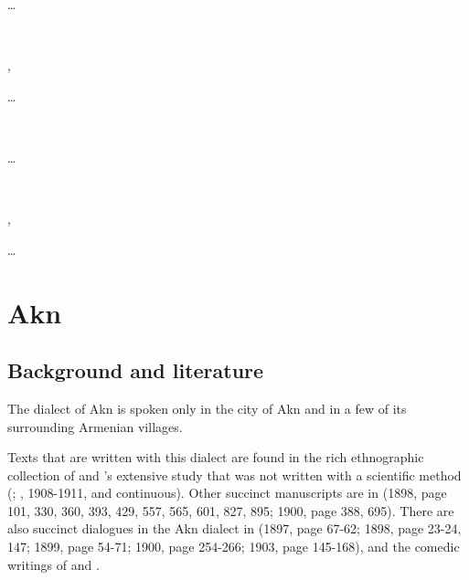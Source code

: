 \begin{adjarianpage}\label{page:221}\end{adjarianpage}%



…


~

,

…



~



…


~

,


…





\chapter{Akn} \label{chapter:Akn}
\section{Background and literature}

\begin{adjarianpage}\label{page:222}\end{adjarianpage}%

The dialect of Akn is spoken only in the city of Akn and in a few of its surrounding Armenian villages. 

Texts that are written with this dialect are found in the rich ethnographic collection of \citet{Janigian-1895-Akn} and \citeauthor{Gabrielian-1912-Akn}'s extensive study that was not written with a scientific method (\citealt{Gabrielian-1912-Akn}; , 1908-1911, and continuous). Other succinct manuscripts are in  (1898, page 101, 330, 360, 393, 429, 557, 565, 601, 827, 895; 1900, page 388, 695). There are also succinct dialogues in the Akn dialect in  (1897, page 67-62; 1898, page 23-24, 147; 1899, page 54-71; 1900, page 254-266; 1903, page 145-168), and the comedic writings of  and . 

